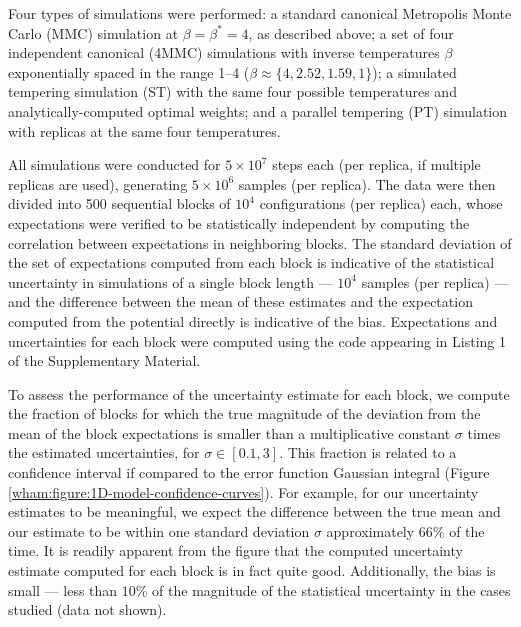 Four types of simulations were performed: a standard canonical Metropolis Monte Carlo (MMC) simulation at $\beta = \beta^* = 4$, as described above; a set of four independent canonical (4MMC) simulations with inverse temperatures $\beta$ exponentially spaced in the range 1--4 ($\beta \approx \{4, 2.52, 1.59, 1\}$); a simulated tempering simulation (ST) with the same four possible temperatures and analytically-computed optimal weights; and a parallel tempering (PT) simulation with replicas at the same four temperatures.  

All simulations were conducted for $5 \times 10^7$ steps each (per replica, if multiple replicas are used), generating $5 \times 10^6$ samples (per replica).  The data were then divided into 500 sequential blocks of $10^4$ configurations (per replica) each, whose expectations were verified to be statistically independent by computing the correlation between expectations in neighboring blocks.  The standard deviation of the set of expectations computed from each block is indicative of the statistical uncertainty in simulations of a single block length --- $10^4$ samples (per replica) --- and the difference between the mean of these estimates and the expectation computed from the potential directly is indicative of the bias.  Expectations and uncertainties for each block were computed using the code appearing in Listing 1 of the Supplementary Material.

To assess the performance of the uncertainty estimate for each block, we compute the fraction of blocks for which the true magnitude of the deviation from the mean of the block expectations is smaller than a multiplicative constant $\sigma$ times the estimated uncertainties, for $\sigma \in [0.1,3]$.  This fraction is related to a confidence interval if compared to the error function Gaussian integral (Figure \ref{wham:figure:1D-model-confidence-curves}).  For example, for our uncertainty estimates to be meaningful, we expect the difference between the true mean and our estimate to be within one standard deviation $\sigma$ approximately 66\% of the time.  It is readily apparent from the figure that the computed uncertainty estimate computed for each block is in fact quite good.  Additionally, the bias is small --- less than $10\%$ of the magnitude of the statistical uncertainty in the cases studied (data not shown).

